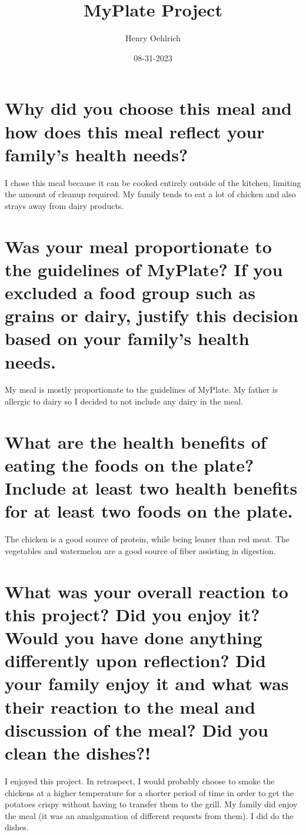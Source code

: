 \documentclass{article}
\title{MyPlate Project}
\author{Henry Oehlrich}
\date{08-31-2023}
\begin{document}
\maketitle{}
\section{Why did you choose this meal and how does this meal reflect your
family’s health needs?}

I chose this meal because it can be cooked entirely outside of the kitchen,
limiting the amount of cleanup required. My family tends to eat a lot of
chicken and also strays away from dairy products.

\section{Was your meal proportionate to the guidelines of MyPlate? If you
excluded a food group such as grains or dairy, justify this decision based on
your family’s health needs.}

My meal is mostly proportionate to the guidelines of MyPlate. My father is
allergic to dairy so I decided to not include any dairy in the meal.

\section{What are the health benefits of eating the foods on the plate? Include
at least two health benefits for at least two foods on the plate.}

The chicken is a good source of protein, while being leaner than red meat. The
vegetables and watermelon are a good source of fiber assisting in digestion.

\section{What was your overall reaction to this project? Did you enjoy it?
Would you have done anything differently upon reflection? Did your family enjoy
it and what was their reaction to the meal and discussion of the meal? Did you
clean the dishes?!}

I enjoyed this project. In retrospect, I would probably choose to smoke the
chickens at a higher temperature for a shorter period of time in order to get
the potatoes crispy without having to transfer them to the grill. My family did
enjoy the meal (it was an amalgamation of different requests from them). I did
do the dishes.
\end{document}
